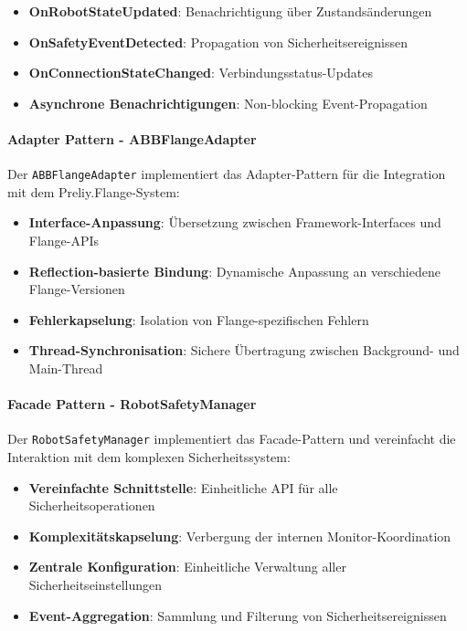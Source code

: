 \begin{itemize}
    \item \textbf{OnRobotStateUpdated}: Benachrichtigung über Zustandsänderungen
    \item \textbf{OnSafetyEventDetected}: Propagation von Sicherheitsereignissen
    \item \textbf{OnConnectionStateChanged}: Verbindungsstatus-Updates
    \item \textbf{Asynchrone Benachrichtigungen}: Non-blocking Event-Propagation
\end{itemize}

\paragraph{Adapter Pattern - ABBFlangeAdapter}
Der \texttt{ABBFlangeAdapter} implementiert das Adapter-Pattern für die
Integration mit dem Preliy.Flange-System:

\begin{itemize}
    \item \textbf{Interface-Anpassung}: Übersetzung zwischen Framework-Interfaces und Flange-APIs
    \item \textbf{Reflection-basierte Bindung}: Dynamische Anpassung an verschiedene Flange-Versionen
    \item \textbf{Fehlerkapselung}: Isolation von Flange-spezifischen Fehlern
    \item \textbf{Thread-Synchronisation}: Sichere Übertragung zwischen Background- und Main-Thread
\end{itemize}

\paragraph{Facade Pattern - RobotSafetyManager}
Der \texttt{RobotSafetyManager} implementiert das Facade-Pattern und
vereinfacht die Interaktion mit dem komplexen Sicherheitssystem:

\begin{itemize}
    \item \textbf{Vereinfachte Schnittstelle}: Einheitliche API für alle Sicherheitsoperationen
    \item \textbf{Komplexitätskapselung}: Verbergung der internen Monitor-Koordination
    \item \textbf{Zentrale Konfiguration}: Einheitliche Verwaltung aller Sicherheitseinstellungen
    \item \textbf{Event-Aggregation}: Sammlung und Filterung von Sicherheitsereignissen
\end{itemize}


